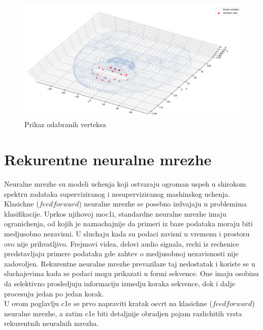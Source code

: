 \documentclass[a4paper, openany, oneside, 11pt]{book}
\begin{document}
\begin{figure}[h!]
\centering
  \includegraphics[scale=0.45]{res/verteksi.png}
  \caption{Prikaz odabranih verteksa}
  \label{fig:2_9}
  \vspace{0pt}
\end{figure}
\chapter{Rekurentne neuralne mrezhe}
Neuralne mrezhe su modeli uchenja koji ostvaraju ogroman uspeh u shirokom spektru zadataka superviziranog i nesuperviziranog mashinskog uchenja. Klasichne ($feedforward$) neuralne mrezhe se posebno izdvajaju u problemima klasifikacije. Uprkos njihovoj moc1i, standardne neuralne mrezhe imaju ogranichenja, od kojih je naznachajnije da primeri iz baze podataka moraju biti medjusobno nezavisni. U sluchaju kada su podaci zavisni u vremenu i prostoru ovo nije prihvatljivo. Frejmovi videa, delovi audio signala, rechi iz rechenice predstavljaju primere podataka gde zahtev o medjusobnoj nezavisnosti nije zadovoljen. Rekurentne neuralne mrezhe prevazilaze taj nedostatak i koriste se u sluchajevima kada se podaci mogu prikazati u formi sekvence. One imaju osobinu da selektivno prosledjuju informaciju izmedju koraka sekvence, dok i dalje procesuju jedan po jedan korak.\\
U ovom poglavlju c1e se prvo napraviti kratak osvrt na klasichne ($feedforward$) neuralne mrezhe, a zatim c1e biti detaljnije obradjen pojam razlichitih vrsta rekurentnih neuralnih mrezha.
\end{document}
